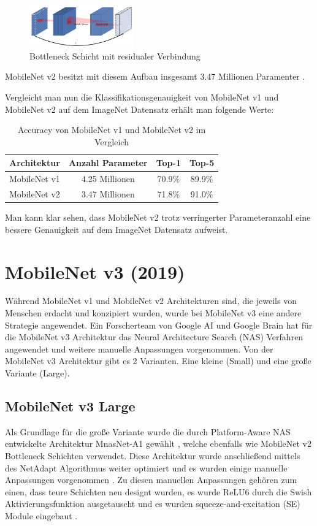 \documentclass[conference]{IEEEtran}
\begin{document}
\begin{figure}[htbp]
\centerline{\includegraphics[width=0.4\textwidth]{residual_bottleneck}}
\caption{Bottleneck Schicht mit residualer Verbindung \cite{b5}}
\label{f1}
\end{figure}

MobileNet v2 besitzt mit diesem Aufbau insgesamt 3.47 Millionen Paramenter \cite{b4}.

Vergleicht man nun die Klassifikationsgenauigkeit von MobileNet v1 und MobileNet v2 auf dem ImageNet Datensatz erhält man folgende Werte:

\begin{table}[htbp]
\caption{Accuracy von MobileNet v1 und MobileNet v2 im Vergleich \cite{b4}}
\begin{center}
\begin{tabular}{|c|c|c|c|}
\hline
Architektur  & Anzahl Parameter & Top-1  & Top-5  \\
\hline
MobileNet v1 & 4.25 Millionen   & 70.9\% & 89.9\% \\
MobileNet v2 & 3.47 Millionen   & 71.8\% & 91.0\% \\
\hline
\end{tabular}
\end{center}
\end{table}

Man kann klar sehen, dass MobileNet v2 trotz verringerter Parameteranzahl eine bessere Genauigkeit auf dem ImageNet Datensatz aufweist.


\section{MobileNet v3 (2019)}
Während MobileNet v1 und MobileNet v2 Architekturen sind, die jeweils von Menschen erdacht und konzipiert wurden, wurde bei MobileNet v3 eine andere Strategie angewendet. Ein Forscherteam von Google AI und Google Brain hat für die MobileNet v3 Architektur das Neural Architecture Search (NAS) Verfahren angewendet und weitere manuelle Anpassungen vorgenommen. Von der MobileNet v3 Architektur gibt es 2 Varianten. Eine kleine (Small) und eine große Variante (Large).

\subsection{MobileNet v3 Large}
Als Grundlage für die große Variante wurde die durch Platform-Aware NAS entwickelte Architektur MnasNet-A1 gewählt \cite{b6}, welche ebenfalls wie MobileNet v2 Bottleneck Schichten verwendet. Diese Architektur wurde anschließend mittels des NetAdapt Algorithmus weiter optimiert und es wurden einige manuelle Anpassungen vorgenommen \cite{b6}. Zu diesen manuellen Anpassungen gehören zum einen, dass teure Schichten neu designt wurden, es wurde ReLU6 durch die Swish Aktivierungsfunktion ausgetauscht und es wurden squeeze-and-excitation (SE) Module eingebaut \cite{b4}.
\end{document}
